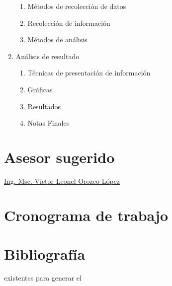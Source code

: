 \documentclass[12pt]{report}
\begin{document}
\begin{enumerate}
\begin{enumerate}
  \item Métodos de recolección de datos
  \item Recolección de información
  \item Métodos de análisis
  \end{enumerate}
\item Análisis de resultado
  \begin{enumerate}
  \item Técnicas de presentación de información
  \item Gráficas
  \item Resultados
  \item Notas Finales
  \end{enumerate}
\end{enumerate}

\chapter*{Asesor sugerido}

\href{http://vorozco.com/cv/index-es.html}{Ing.  Msc.   Víctor  Leonel
Orozco López}


\chapter*{Cronograma de trabajo} %

\chapter*{Bibliografía}  %
existentes para generar el %

\end{document}
